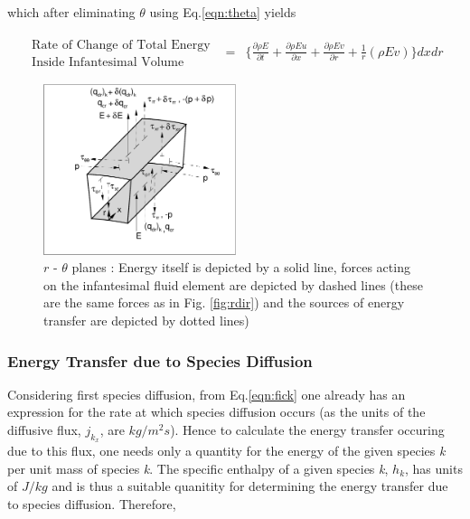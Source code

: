 	which after eliminating $\theta$ using Eq.\ref{eqn:theta} yields

\begin{equation}
	\begin{array}{ccc}
		\begin{array}{c}
		\textrm{Rate of Change of Total Energy} \\ \textrm{Inside Infantesimal Volume}
		\end{array} & = &
		\Big\{\frac{\partial \rho E}{\partial t} +\frac{\partial \rho E u}{\partial x} + \frac{\partial \rho E v}
		{\partial r} + \frac{1}{r}(\rho E v)\Big\}dxdr
	\end{array}
\label{eqn:energychange}
\end{equation}

\begin{figure}[hb]
\includegraphics[height=5cm]{./rdirener.eps}
\caption[$r$ - $\theta$ planes]{$r$ - $\theta$ planes : Energy itself is depicted by a solid line, forces  
				acting on the infantesimal fluid element are depicted by dashed lines (these
				are the same forces as in Fig. \ref{fig:rdir}) and the sources of energy
				transfer are depicted by dotted lines)}
\label{fig:rdirener}
\end{figure}

\subsubsection{Energy Transfer due to Species Diffusion}

	Considering first species diffusion, from Eq.\ref{eqn:fick} one already has an expression for the rate
at which species diffusion occurs (as the units of the diffusive flux, $j_{k_x}$, are $kg/m^2 s$).  Hence to calculate the 
energy transfer occuring due to this flux, one needs only a quantity for the energy of the given species \emph{k}
per unit mass of species \emph{k}.  The specific enthalpy of a given species \emph{k}, $h_k$, has units of
$J/kg$ and is thus a suitable quanitity for determining the energy transfer due to species diffusion.  Therefore,

